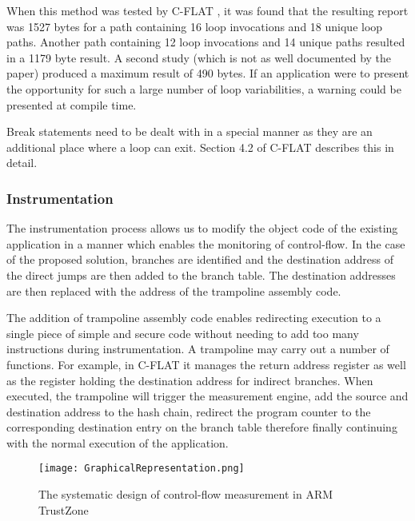 When this method was tested by C-FLAT \cite{Abera2016}, it was found that the resulting report was 1527 bytes for a path containing 16 loop invocations and 18 unique loop paths. Another path containing 12 loop invocations and 14 unique paths resulted in a 1179 byte result. A second study (which is not as well documented by the paper) produced a maximum result of 490 bytes. If an application were to present the opportunity for such a large number of loop variabilities, a warning could be presented at compile time.

Break statements need to be dealt with in a special manner as they are an additional place where a loop can exit. Section 4.2 of C-FLAT \cite{Abera2016} describes this in detail.

\subsubsection*{Instrumentation}

The instrumentation process allows us to modify the object code of the existing application in a manner which enables the monitoring of control-flow. In the case of the proposed solution, branches are identified and the destination address of the direct jumps are then added to the branch table. The destination addresses are then replaced with the address of the trampoline assembly code. 

The addition of trampoline assembly code enables redirecting execution to a single piece of simple and secure code without needing to add too many instructions during instrumentation. A trampoline may carry out a number of functions. For example, in C-FLAT \cite{Abera2016} it manages the return address register as well as the register holding the destination address for indirect branches. When executed, the trampoline will trigger the measurement engine, add the source and destination address to the hash chain, redirect the program counter to the corresponding destination entry on the branch table therefore finally continuing with the normal execution of the application.

\begin{figure}
  \centering
  \vspace*{0.5in}
  \texttt{[image: GraphicalRepresentation.png]}
  \caption{The systematic design of control-flow measurement in ARM TrustZone}
  \label{fig:graphicalRepresentation}
\end{figure}
